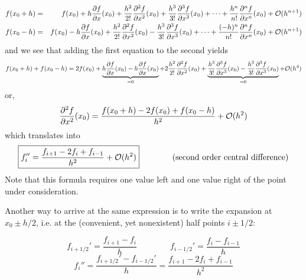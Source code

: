 \begin{eqnarray}
f(x_0+h)&=&f(x_0)+ 
h \frac{\partial f}{\partial x}(x_0)  + 
\frac{h^2}{2!} \frac{\partial^2 f}{\partial x^2}(x_0)  +
\frac{h^3}{3!} \frac{\partial^3 f}{\partial x^3}(x_0)  +
\dots  +
\frac{h^n}{n!} \frac{\partial^n f}{\partial x^n}(x_0)  
+ {\cal O}(h^{n+1}) 
\nonumber\\
f(x_0-h)&=&f(x_0) 
-h \frac{\partial f}{\partial x}(x_0)  + 
\frac{h^2}{2!} \frac{\partial^2 f}{\partial x^2}(x_0)  -
\frac{h^3}{3!} \frac{\partial^3 f}{\partial x^3}(x_0)  +
\dots  +
\frac{(-h)^n}{n!} \frac{\partial^n f}{\partial x^n}(x_0)  
+ {\cal O}(h^{n+1}) \nonumber
\end{eqnarray}
and we see that adding the first equation to the second yields
\begin{equation}
f(x_0+h) + f(x_0-h) =2 f(x_0)+ 
\underbrace{h \frac{\partial f}{\partial x}(x_0)   
-h \frac{\partial f}{\partial x}(x_0)}_{=0}  + 
2\frac{h^2}{2!} \frac{\partial^2 f}{\partial x^2}(x_0)  
+
\underbrace{
\frac{h^3}{3!} \frac{\partial^3 f}{\partial x^3}(x_0)  
-\frac{h^3}{3!} \frac{\partial^3 f}{\partial x^3}(x_0)  
}_{=0}
+ {\cal O}(h^{4})
\end{equation}
or, 
\begin{equation}
\frac{\partial^2 f}{\partial x^2}(x_0)  =
\frac{f(x_0+h) -2f(x_0) + f(x_0-h) }{h^2}
+ {\cal O}(h^2)
\end{equation}
which translates into
\begin{equation}
\boxed{
f_{i}''=\frac{f_{i+1}-2f_i+f_{i-1}}{h^2} + {\cal O}(h^2)
}
\qquad
\qquad
\text{(second order central difference)}
\end{equation}
Note that this formula requires one value left and one value right of the point 
under consideration. 

Another way to arrive at the same expression is to write the expansion at $x_0 \pm h/2$, 
i.e. at the (convenient, yet nonexistent) half points $i\pm 1/2$:

\begin{center}

\end{center}


%     
%

\begin{equation}
f_{i+1/2}'=\frac{f_{i+1}-f_i}{h}
\quad\quad
\quad\quad
f_{i-1/2}'=\frac{f_{i}-f_{i-1}}{h}
\end{equation}
\begin{equation}
f_i''=\frac{f_{i+1/2}'-f_{i-1/2}'}{h} = 
\frac{f_{i+1}-2f_i+f_{i-1}}{h^2} 
\end{equation}

